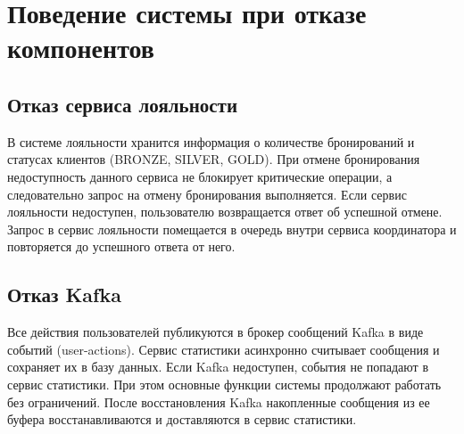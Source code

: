 \section{Поведение системы при отказе компонентов}

\subsection{Отказ сервиса лояльности}
В системе лояльности хранится информация о количестве бронирований и статусах клиентов (BRONZE, SILVER, GOLD).  
При отмене бронирования недоступность данного сервиса не блокирует критические операции, а следовательно запрос на отмену бронирования выполняется. Если сервис лояльности недоступен, пользователю возвращается ответ об успешной отмене. Запрос в сервис лояльности помещается в очередь внутри сервиса координатора и повторяется до успешного ответа от него.

\subsection{Отказ Kafka}
Все действия пользователей публикуются в брокер сообщений Kafka в виде событий (user-actions).  
Сервис статистики асинхронно считывает сообщения и сохраняет их в базу данных. Если Kafka недоступен, события не попадают в сервис статистики. При этом основные функции системы продолжают работать без ограничений. После восстановления Kafka накопленные сообщения из ее буфера восстанавливаются и доставляются в сервис статистики.
